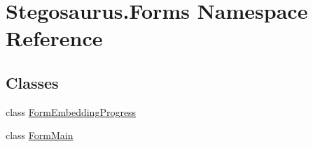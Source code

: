 \hypertarget{namespace_stegosaurus_1_1_forms}{}\section{Stegosaurus.\+Forms Namespace Reference}
\label{namespace_stegosaurus_1_1_forms}
\subsection*{Classes}
\begin{DoxyCompactItemize}
\item 
class \hyperlink{class_stegosaurus_1_1_forms_1_1_form_embedding_progress}{Form\+Embedding\+Progress}
\item 
class \hyperlink{class_stegosaurus_1_1_forms_1_1_form_main}{Form\+Main}
\end{DoxyCompactItemize}
